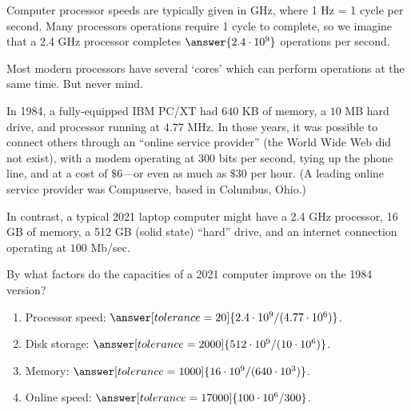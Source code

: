 \documentclass[nooutcomes]{ximera}
\begin{document}
\begin{problem}
Computer processor speeds are typically given in GHz, where 1 Hz = 1 cycle per second.  Many processors operations require 1 cycle to complete, so we imagine that a 2.4 GHz processor completes $\answer{2.4\cdot10^9}$ operations per second.  

Most modern processors have several `cores' which can perform operations at the same time.  But never mind.  

In 1984, a fully-equipped IBM PC/XT had $640$ KB of memory, a $10$ MB hard drive, and processor running at $4.77$ MHz.  In those years, it was possible to connect others through an ``online service provider'' (the World Wide Web did not exist), with a modem operating at 300 bits per second, tying up the phone line, and at a cost of $\$6$---or even as much as $\$30$ per hour.  (A leading online service provider was Compuserve, based in Columbus, Ohio.)  

In contrast, a typical 2021 laptop computer might have a 2.4 GHz processor, 16 GB of memory, a 512 GB (solid state) ``hard'' drive, and an internet connection operating at $100$ Mb/sec.  

By what factors do the capacities of a 2021 computer improve on the 1984 version?  

\begin{enumerate}
\item Processor speed: $\answer[tolerance=20]{2.4\cdot10^9/(4.77\cdot10^6)}$.  %
\item Disk storage: $\answer[tolerance=2000]{512\cdot10^9/(10\cdot10^6)}$.     %
\item Memory: $\answer[tolerance=1000]{16\cdot10^9/(640\cdot10^3)}$.           %
\item Online speed: $\answer[tolerance=17000]{100\cdot10^6/300}$.              %
\end{enumerate}
\end{problem}
\end{document}
